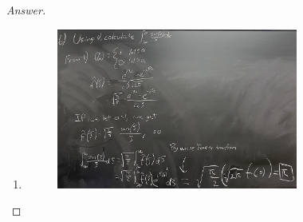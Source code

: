 \documentclass{article}
\theoremstyle{definition}
\renewcommand\qedsymbol{$\blacksquare$}
\newenvironment{ans}{\begin{proof}[Answer]\renewcommand{\qedsymbol}{}}{\end{proof}}
\begin{document}
\begin{ans}
\begin{enumerate}
        \item \phantom{.}
        \begin{figure}[H]
            \centering
            \includegraphics[width = 0.75\textwidth]{Problem 5 Part 6.jpeg}
        \end{figure}
    \end{enumerate}
\end{ans}
\end{document}
